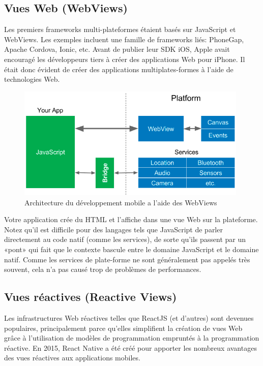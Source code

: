 \subsection{Vues Web (WebViews)}
Les premiers frameworks multi-plateformes étaient basés sur JavaScript et WebViews. Les exemples incluent une famille de frameworks liés: PhoneGap, Apache Cordova, Ionic, etc. Avant de publier leur SDK iOS, Apple avait encouragé les développeurs tiers à créer des applications Web pour iPhone. Il était donc évident de créer des applications multiplates-formes à l'aide de technologies Web.

\begin{figure}[h]
	\begin{center}
		\includegraphics[width=11cm]{Images/chapter2/webview.png}
		\caption{{\footnotesize Architecture du développement mobile a l'aide des WebViews\cite{leler_whats_2017}}}
	\end{center}
\end{figure}

Votre application crée du HTML et l'affiche dans une vue Web sur la plateforme. Notez qu'il est difficile pour des langages tels que JavaScript de parler directement au code natif (comme les services), de sorte qu'ils passent par un «pont» qui fait que le contexte bascule entre le domaine JavaScript et le domaine natif. Comme les services de plate-forme ne sont généralement pas appelés très souvent, cela n’a pas causé trop de problèmes de performances\cite{leler_whats_2017}.

\subsection{Vues réactives (Reactive Views)}
Les infrastructures Web réactives telles que ReactJS (et d'autres) sont devenues populaires, principalement parce qu'elles simplifient la création de vues Web grâce à l'utilisation de modèles de programmation empruntés à la programmation réactive. En 2015, React Native a été créé pour apporter les nombreux avantages des vues réactives aux applications mobiles.\\


